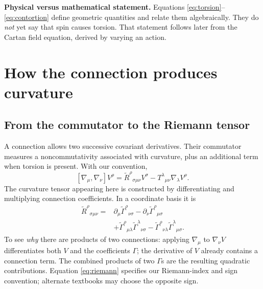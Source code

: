 \documentclass[11pt,a4paper]{article}
\begin{document}
\begin{whybox}\textbf{Physical versus mathematical statement.} Equations \eqref{eq:torsion}--\eqref{eq:contortion} define geometric quantities and relate them algebraically. They do \emph{not} yet say that spin causes torsion. That statement follows later from the Cartan field equation, derived by varying an action.\end{whybox}

\section{How the connection produces curvature}
\subsection{From the commutator to the Riemann tensor}
A connection allows two successive covariant derivatives. Their commutator measures a noncommutativity associated with curvature, plus an additional term when torsion is present. With our convention,
\begin{equation}\label{eq:commutator}
[\nabla_\mu,\nabla_\nu]V^\rho=\widetilde R^\rho{}_{\sigma\mu\nu}V^\sigma-T^\lambda{}_{\mu\nu}\nabla_\lambda V^\rho.
\end{equation}
The curvature tensor appearing here is constructed by differentiating and multiplying connection coefficients. In a coordinate basis it is
\begin{equation}\label{eq:riemann}
\boxed{\begin{aligned}
\widetilde R^\rho{}_{\sigma\mu\nu}={}&\partial_\mu\widetilde\Gamma^\rho{}_{\nu\sigma}-\partial_\nu\widetilde\Gamma^\rho{}_{\mu\sigma}\\
&+\widetilde\Gamma^\rho{}_{\mu\lambda}\widetilde\Gamma^\lambda{}_{\nu\sigma}-\widetilde\Gamma^\rho{}_{\nu\lambda}\widetilde\Gamma^\lambda{}_{\mu\sigma}.
\end{aligned}}
\end{equation}
To see \emph{why} there are products of two connections: applying $\nabla_\mu$ to $\nabla_\nu V$ differentiates both $V$ and the coefficients $\Gamma$; the derivative of $V$ already contains a connection term. The combined products of two $\Gamma$s are the resulting quadratic contributions. Equation \eqref{eq:riemann} specifies our Riemann-index and sign convention; alternate textbooks may choose the opposite sign.
\end{document}
